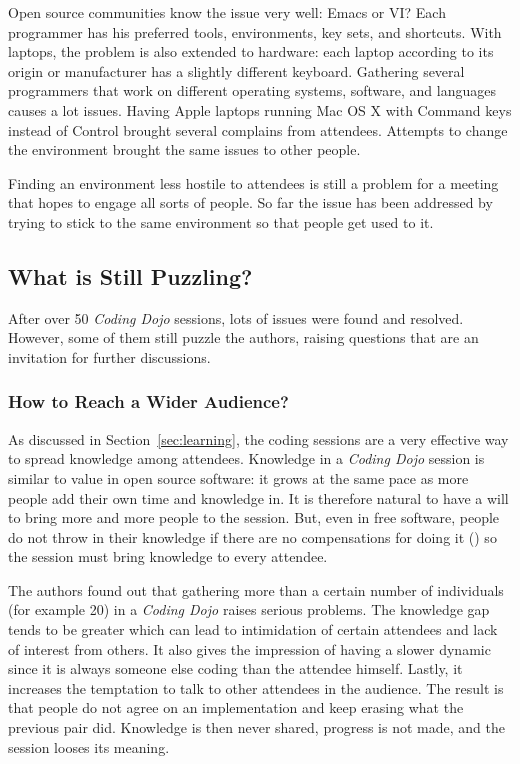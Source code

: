 Open source communities know the issue very well: Emacs or VI? Each programmer
has his preferred tools, environments, key sets, and
shortcuts. With laptops, the problem is also extended to hardware:
each laptop according to its origin or manufacturer has a slightly
different keyboard. Gathering several programmers that work on
different operating systems, software, and languages causes a lot
issues. Having Apple laptops running Mac OS X with Command keys
instead of Control brought several complains from attendees. Attempts
to change the environment brought the same issues to other people.

Finding an environment less hostile to attendees is still a problem
for a meeting that hopes to engage all sorts of people. So far the
issue has been addressed by trying to stick to the same environment so
that people get used to it.

\subsection{What is Still Puzzling?}\label{ssub:puzzles}

After over 50 \emph{Coding Dojo} sessions, lots of issues were found
and resolved. However, some of them still puzzle the authors, raising
questions that are an invitation for further discussions.

\subsubsection{How to Reach a Wider Audience?}

As discussed in Section~\ref{sec:learning}, the coding sessions
are a very effective way to spread knowledge among attendees. Knowledge in a
\emph{Coding Dojo} session is similar to value in open source
software: it grows at the same pace as more people add their own time
and knowledge in. It is therefore natural to have a will to bring more
and more people to the session. But, even in free software, people do not
throw in their knowledge if there are no compensations for doing it
(\cite{RishabGhosh}) so the session must bring knowledge to every
attendee.

The authors found out that gathering more than a certain number of
individuals (for example 20) in a \emph{Coding Dojo} raises serious
problems. The knowledge gap tends to be greater which can lead to
intimidation of certain attendees and lack of interest from others. It
also gives the impression of having a slower dynamic since it is
always someone else coding than the attendee himself. Lastly, it
increases the temptation to talk to other attendees in the
audience. The result is that people do not agree on an implementation
and keep erasing what the previous pair did. Knowledge is then never
shared, progress is not made, and the session looses its meaning.

